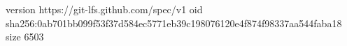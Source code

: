 version https://git-lfs.github.com/spec/v1
oid sha256:0ab701bb099f53f37d584ec5771eb39c198076120e4f874f98337aa544faba18
size 6503
